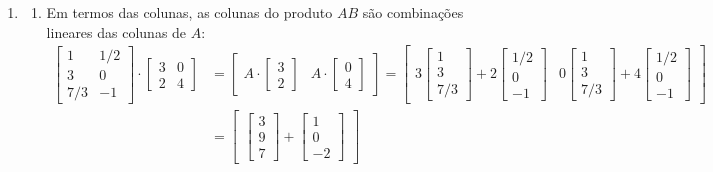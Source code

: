 \documentclass[12pt,a4paper]{article}
\begin{document}
\begin{enumerate}
\item
\begin{enumerate}
\item Em termos das colunas, as colunas do produto $AB$ são combinações lineares das colunas de $A$:
\begin{align*}
\begin{bmatrix}
  1 & 1/2 \\
  3 & 0 \\
7/3 & -1
\end{bmatrix}
\cdot
\begin{bmatrix}
3 & 0 \\
2 & 4
\end{bmatrix}
& =
\begin{bmatrix}
A \cdot \begin{bmatrix}
3 \\
2
\end{bmatrix}
 & A \cdot \begin{bmatrix}
0 \\
4
\end{bmatrix}
\end{bmatrix}
=
\begin{bmatrix}
3
\begin{bmatrix}
  1 \\
  3 \\
7/3
\end{bmatrix}
+ 2
\begin{bmatrix}
1/2 \\
0 \\
-1
\end{bmatrix}
&
0
\begin{bmatrix}
  1 \\
  3 \\
7/3
\end{bmatrix}
+ 4
\begin{bmatrix}
1/2 \\
0 \\
-1
\end{bmatrix}
\end{bmatrix} \\
& =
\begin{bmatrix}
\begin{bmatrix}
3 \\
9 \\
7
\end{bmatrix}
+
\begin{bmatrix}
1 \\
0 \\
-2
\end{bmatrix}

\end{bmatrix}
\end{align*}
\end{enumerate}
\end{enumerate}
\end{document}
